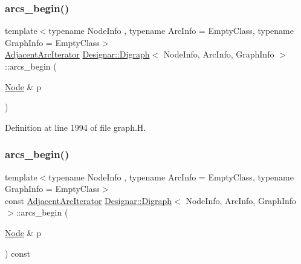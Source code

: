 \subsubsection{\texorpdfstring{arcs\+\_\+begin()}{arcs\_begin()}\hspace{0.1cm}{\footnotesize\ttfamily [3/4]}}
{\footnotesize\ttfamily template$<$typename Node\+Info , typename Arc\+Info  = Empty\+Class, typename Graph\+Info  = Empty\+Class$>$ \\
\hyperlink{class_designar_1_1_digraph_1_1_adjacent_arc_iterator}{Adjacent\+Arc\+Iterator} \hyperlink{class_designar_1_1_digraph}{Designar\+::\+Digraph}$<$ Node\+Info, Arc\+Info, Graph\+Info $>$\+::arcs\+\_\+begin (\begin{DoxyParamCaption}\item[{\hyperlink{class_designar_1_1_digraph_a4dc921c41a480b7946a04170e997d8ae}{Node} \&}]{p }\end{DoxyParamCaption})\hspace{0.3cm}{\ttfamily [inline]}}



Definition at line 1994 of file graph.\+H.

\mbox{\label{class_designar_1_1_digraph_aa17a29b3ea956a3ad98e991fb13d0a20}} 
\subsubsection{\texorpdfstring{arcs\+\_\+begin()}{arcs\_begin()}\hspace{0.1cm}{\footnotesize\ttfamily [4/4]}}
{\footnotesize\ttfamily template$<$typename Node\+Info , typename Arc\+Info  = Empty\+Class, typename Graph\+Info  = Empty\+Class$>$ \\
const \hyperlink{class_designar_1_1_digraph_1_1_adjacent_arc_iterator}{Adjacent\+Arc\+Iterator} \hyperlink{class_designar_1_1_digraph}{Designar\+::\+Digraph}$<$ Node\+Info, Arc\+Info, Graph\+Info $>$\+::arcs\+\_\+begin (\begin{DoxyParamCaption}\item[{\hyperlink{class_designar_1_1_digraph_a4dc921c41a480b7946a04170e997d8ae}{Node} \&}]{p }\end{DoxyParamCaption}) const\hspace{0.3cm}{\ttfamily [inline]}}



